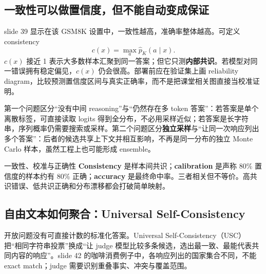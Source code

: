 
\subsection{一致性可以做置信度，但不能自动变成保证}

slide 39 显示在该 GSM8K 设置中，一致性越高，准确率整体越高。可定义 consistency
\[
c(x)=\max_a\widehat p_K(a\mid x).
\]
$c(x)$ 接近 1 表示大多数样本汇聚到同一答案；但它只测\textbf{内部共识}。若模型对同一错误拥有稳定偏见，$c(x)$ 仍会很高。部署前应在验证集上画 reliability diagram，比较预测置信度区间与真实正确率，而不是把课堂相关图直接当校准证明。



第一个问题区分“没有中间 reasoning”与“仍然存在多 token 答案”：若答案是单个离散标签，可直接读取 logits 得到全分布，不必用采样近似；若答案是长字符串，序列概率仍需要搜索或采样。第二个问题区分\textbf{独立采样}与“让同一次响应列出多个答案”：后者的候选共享上下文并相互影响，不再是同一分布的独立 Monte Carlo 样本，虽然工程上也可能形成 ensemble。

\begin{knowledgebox}{一致性、校准与正确性}
\textbf{Consistency} 是样本间共识；\textbf{calibration} 是声称 80\% 置信度的样本约有 80\% 正确；\textbf{accuracy} 是最终命中率。三者相关但不等价。高共识错误、低共识正确和分布漂移都会打破简单映射。
\end{knowledgebox}

\subsection{自由文本如何聚合：Universal Self-Consistency}

开放问题没有可直接计数的标准化答案。Universal Self-Consistency（USC）把“相同字符串投票”换成“让 judge 模型比较多条候选，选出最一致、最能代表共同内容的响应”。slide 42 的咖啡消费例子中，各响应列出的国家集合不同，不能 exact match；judge 需要识别重叠事实、冲突与覆盖范围。


